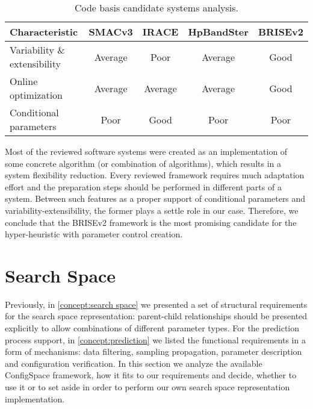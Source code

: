 \begin{table}[h!]
	\centering
	\begin{tabular}{l|cccc}
		\hline
		\rowcolor{gray!10}
		\textbf{Characteristic} & \textbf{SMACv3}& \textbf{IRACE} & \textbf{HpBandSter} & \textbf{BRISEv2} \\
		\hline
		Variability \& extensibility & \cellcolor{yellow!25}Average & \cellcolor{red!25}Poor & \cellcolor{yellow!25}Average & \cellcolor{green!25}Good \\
	
		Online optimization & \cellcolor{yellow!25}Average & \cellcolor{yellow!25}Average & \cellcolor{yellow!25}Average & \cellcolor{green!25}Good \\
	
		Conditional parameters & \cellcolor{red!25}Poor & \cellcolor{green!25}Good & \cellcolor{red!25}Poor & \cellcolor{red!25}Poor \\
		\hline
	\end{tabular}
	\caption{Code basis candidate systems analysis.}
	\label{iml: table code basis selection}
\end{table}

Most of the reviewed software systems were created as an implementation of some concrete algorithm (or combination of algorithms), which results in a system flexibility reduction. Every reviewed framework requires much adaptation effort and the preparation steps should be performed in different parts of a system. Between such features as a proper support of conditional parameters and variability-extensibility, the former plays a settle role in our case. Therefore, we conclude that the BRISEv2 framework is the most promising candidate for the hyper-heuristic with parameter control creation.

\section{Search Space}\label{impl: search space}
Previously, in \cref{concept:search space} we presented a set of structural requirements for the search space representation: parent-child relationships should be presented explicitly to allow combinations of different parameter types. For the prediction process support, in \cref{concept:prediction} we listed the functional requirements in a form of mechanisms: data filtering, sampling propagation, parameter description and configuration verification. In this section we analyze the available ConfigSpace framework, how it fits to our requirements and decide, whether to use it or to set aside in order to perform our own search space representation implementation.

